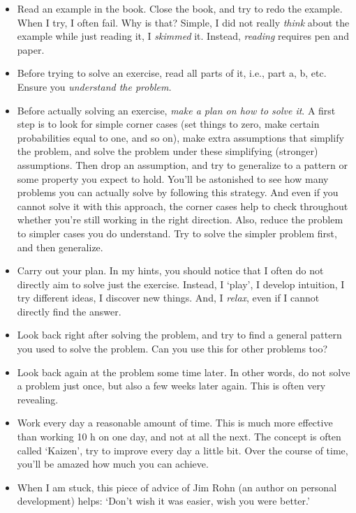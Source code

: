 \documentclass[a4paper]{article}
\theoremstyle{definition}
\newcommand{\1}[1]{\,I_{#1}} %
\begin{document}
\begin{itemize}
\item Read an example in the book. Close the book, and try to redo the example. When I try, I often fail. Why is that? Simple, I did not really \emph{think} about the example while just reading it, I \emph{skimmed} it.  Instead, \emph{reading} requires pen and paper.
\item Before trying to solve an exercise, read all parts of it, i.e., part a, b, etc. Ensure you \emph{understand the problem.}
\item Before actually solving  an exercise, \emph{make a plan on how to solve it}. A first step is to look for simple corner cases (set things to zero, make certain probabilities equal to one, and so on), make extra assumptions that simplify the problem, and solve the problem under these simplifying (stronger) assumptions. Then drop an assumption, and try to generalize to a pattern or some property you expect to hold. You'll be astonished to see how many problems you can actually solve by following this strategy. And even if you cannot solve it with this approach, the corner cases help to check throughout whether you're still working in the right direction. Also, reduce the problem to simpler cases you do understand. Try to solve the simpler problem first, and then generalize.
\item Carry out your plan. In my hints, you should notice that I often do not directly aim to solve just the exercise. Instead, I `play', I develop intuition, I try different ideas, I discover new things. And, I \emph{relax}, even if I cannot directly find the answer.
\item Look back right after solving the problem, and try to find a general pattern you used to solve the problem. Can you use this for other problems too?
\item Look back again at the problem some time later. In other words, do not solve  a problem just once, but also a few weeks later again. This is often very revealing.
\item Work every day a reasonable amount of time. This is much more effective than working 10 h on one day, and not at all the next. The concept is often called `Kaizen', try to improve every day a little bit. Over the course of time, you'll be amazed how much you can achieve.
\item When I am stuck, this piece of advice of Jim Rohn (an author on personal development) helps: `Don't wish it was easier, wish you were better.'
\end{itemize}
\end{document}
